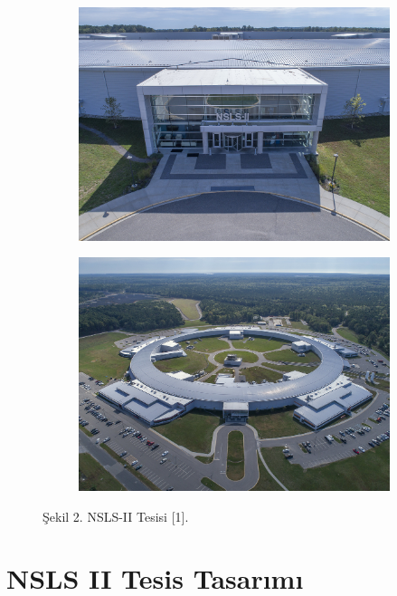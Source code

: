 \documentclass{article}
\begin{document}
\begin{figure}[h]
\centering
\begin{subfigure}{0.4\textwidth}
\includegraphics[width=1\linewidth]{27597220709_1e50948a52_k.jpg}
\end{subfigure}	
\begin{subfigure}{0.4\textwidth}	
\includegraphics[width=1\linewidth]{39344406832_b5a2641959_k.jpg}
\end{subfigure}
\caption*{Şekil 2. NSLS-II Tesisi [1].}
\end{figure}
   
   
   
   \newpage
   

\section{NSLS II Tesis Tasarımı}
\end{document}

